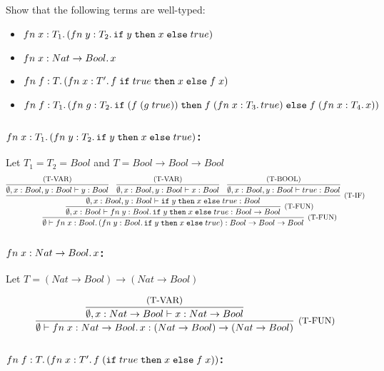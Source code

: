 \subsection{}

Show that the following terms are well-typed:
\begin{itemize}
	\item $fn\;x: T_1.\,(fn\;y: T_2.\,\texttt{if}\;y\;\texttt{then}\;x\;\texttt{else}\;true)$
	\item $fn\;x: Nat \to Bool.\,x$
	\item $fn\;f: T.\,(fn\;x: T'.\,f\;\texttt{if}\;true\;\texttt{then}\;x\;\texttt{else}\;f\;x)$
	\item $fn\;f: T_1.\,(fn\;g: T_2.\,\texttt{if}\;(f\;(g\;true))\;\texttt{then}\;f\;(fn\;x:T_3.\,true)\;\texttt{else}\;f\;(fn\;x: T_4.\,x))$
\end{itemize}

\subsubsection*{$fn\;x: T_1.\,(fn\;y: T_2.\,\texttt{if}\;y\;\texttt{then}\;x\;\texttt{else}\;true)$:}

Let $T_1 = T_2 = Bool$ and $T = Bool \to Bool \to Bool$
\[
	\infer[\text{\small{(T-FUN)}}]
	{\emptyset \vdash \FN{x: Bool}{(\FN{y: Bool}{\IF{y}{x}{true}})}: Bool \to Bool \to Bool}
	{
		\infer[\text{\small{(T-FUN)}}]
		{ \emptyset, x: Bool \vdash \FN{y: Bool}{\IF{y}{x}{true}}: Bool \to Bool }
		{
			\infer[\text{\small{(T-IF)}}]
			{\emptyset, x: Bool, y: Bool \vdash \IF{y}{x}{true}: Bool}
			{
				\infer{\emptyset, x: Bool, y: Bool \vdash y: Bool}{\text{\small{(T-VAR)}}} &
				\infer{\emptyset, x: Bool, y: Bool \vdash x: Bool}{\text{\small{(T-VAR)}}} &
				\infer{\emptyset, x: Bool, y: Bool \vdash true: Bool}{\text{\small{(T-BOOL)}}}
			}
		}
	}
\]

\subsubsection*{$fn\;x: Nat \to Bool.\,x$:}

Let $T = (Nat \to Bool) \to (Nat \to Bool)$

\[
	\infer[\text{\small{(T-FUN)}}]
	{\emptyset \vdash \FN{x: Nat \to Bool}{x}: (Nat \to Bool) \to (Nat \to Bool)}
	{
		\infer{ \emptyset, x: Nat \to Bool \vdash x: Nat \to Bool }{\text{\small{(T-VAR)}}}
	}
\]

\subsubsection*{$fn\;f: T.\,(fn\;x: T'.\,f\;(\texttt{if}\;true\;\texttt{then}\;x\;\texttt{else}\;f\;x))$:}


